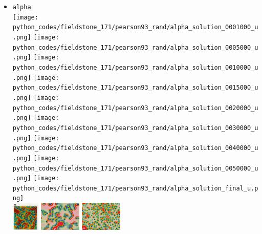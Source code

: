 \begin{itemize}
\item {\tt alpha}\\
\texttt{[image: python\_codes/fieldstone\_171/pearson93\_rand/alpha\_solution\_0001000\_u.png]}
\texttt{[image: python\_codes/fieldstone\_171/pearson93\_rand/alpha\_solution\_0005000\_u.png]}
\texttt{[image: python\_codes/fieldstone\_171/pearson93\_rand/alpha\_solution\_0010000\_u.png]}
\texttt{[image: python\_codes/fieldstone\_171/pearson93\_rand/alpha\_solution\_0015000\_u.png]}
\texttt{[image: python\_codes/fieldstone\_171/pearson93\_rand/alpha\_solution\_0020000\_u.png]}
\texttt{[image: python\_codes/fieldstone\_171/pearson93\_rand/alpha\_solution\_0030000\_u.png]}
\texttt{[image: python\_codes/fieldstone\_171/pearson93\_rand/alpha\_solution\_0040000\_u.png]}
\texttt{[image: python\_codes/fieldstone\_171/pearson93\_rand/alpha\_solution\_0050000\_u.png]}
\texttt{[image: python\_codes/fieldstone\_171/pearson93\_rand/alpha\_solution\_final\_u.png]}\\
\includegraphics[height=1.4cm]{python_codes/fieldstone_171/images/pear93_alpha}
\includegraphics[height=1.4cm]{python_codes/fieldstone_171/images/munafo_alpha1}
\includegraphics[height=1.4cm]{python_codes/fieldstone_171/images/munafo_alpha2}


\end{itemize}
